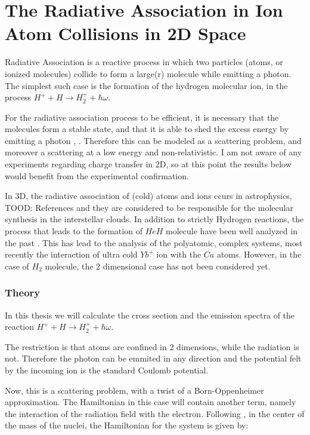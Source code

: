 \chapter{The Radiative Association in Ion Atom Collisions in 2D Space} 

Radiative Association is a reactive process in which two particles (atoms, or ionized molecules) collide to form a large(r) molecule while emitting a photon. The simplest such case is the formation of the hydrogen molecular ion, in the process $ H^{+} + H \rightarrow H_2^{+} + \hbar\omega $.

For the radiative association process to be efficient, it is necessary that the molecules form a stable state, and that it is able to shed the excess energy by emitting a photon \cite{Zygelman89},\cite{Zygelman1} . Therefore this can be modeled as a scattering problem, and moreover a scattering at a low energy and non-relativistic. I am not aware of any experiments regarding charge transfer in 2D, so at this point the results below would benefit from the experimental confirmation.  

In 3D, the radiative association of (cold) atoms and ions ccurs in astrophysics, TOOD: References  and they are considered to be responsible for the molecular synthesis in the interstellar clouds. In addition to strictly Hydrogen reactions, the process that leads to the formation of $ HeH $ molecule have been well analyzed in the past \cite{Zygelman1}. This has lead to the analysis of the polyatomic, complex systems, most recently the interaction of ultra cold $ Yb^{+} $ ion with the $ Ca $ atoms. However, in the case of $ H_2 $ molecule, the 2 dimensional case has not been considered yet. 

\subsection{Theory} 

In this thesis we will calculate the cross section and the emission spectra of the reaction $ H^{+} + H \rightarrow H_2^{+} + \hbar\omega $.

The restriction is that atoms are confined in 2 dimensions, while the radiation is not. Therefore the photon can be emmited in any direction and the potential felt by the incoming ion is the standard Coulomb potential.

Now, this is a scattering problem, with a twist of a Born-Oppenheimer approximation. The Hamiltonian in this case will contain another term, namely the interaction of the radiation field with the electron.  Following \cite{Zygelman88}\cite{Zygelman89},  in the center of the mass of the nuclei, the Hamiltonian for the system is given by: 

